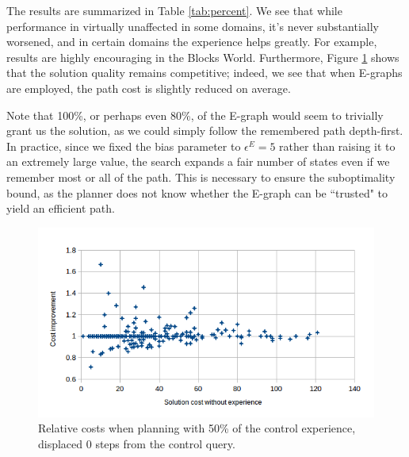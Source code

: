 \documentclass[letterpaper]{article}
\begin{document}
The results are summarized in Table \ref{tab:percent}.
We see that while performance in virtually unaffected in some domains, it's never substantially worsened, and in certain domains the experience helps greatly.
For example, results are highly encouraging in the Blocks World.
Furthermore, Figure \ref{fig:c_50_0} shows that the solution quality remains competitive; indeed, we see that when E-graphs are employed, the path cost is slightly reduced on average.

Note that 100\%, or perhaps even 80\%, of the E-graph would seem to trivially grant us the solution, as we could simply follow the remembered path depth-first.
In practice, since we fixed the bias parameter to $\epsilon^E=5$ rather than raising it to an extremely large value, the search expands a fair number of states even if we remember most or all of the path.
This is necessary to ensure the suboptimality bound, as the planner does not know whether the E-graph can be ``trusted" to yield an efficient path.

\begin{figure}
	\begin{center}
	\includegraphics[scale=0.5]{Cost_50_0.png}
	\end{center}
	\caption{Relative costs when planning with 50\% of the control experience, displaced 0 steps from the control query.}
	 \label{fig:c_50_0}
\end{figure}
\end{document}
